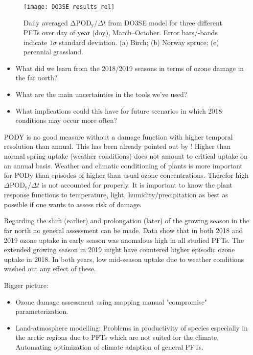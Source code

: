 \documentclass[bg, manuscript]{copernicus}
\begin{document}
\begin{figure}[t]
  \texttt{[image: DO3SE\_results\_rel]}
  \caption{Daily averaged $\mathrm{\Delta POD_y}/\Delta t$ from DO3SE model for three different PFTs over day of year (doy), March--October. Error bars/-bands indicate $1 \sigma$ standard deviation. (a) Birch; (b) Norway spruce; (c) perennial grassland.}
  \label{fig:pody_rel}
\end{figure}

\label{sec:conc} 
\begin{itemize}
  \item What did we learn from the 2018/2019 seasons in terms of ozone damage in the far north?
  \item What are the main uncertainties in the tools we've used?
  \item What implications could this have for future scenarios in which 2018 conditions may occur more often?
\end{itemize}
PODY is no good measure without a damage function with higher temporal resolution than annual. This has been already pointed out by \citet{AE:Musselman2006}! Higher than normal spring uptake (weather conditions) does not amount to critical uptake on an annual basis. 
Weather and climatic conditioning of plants is more important for PODy than episodes of higher than usual ozone concentrations. Therefor high $\Delta \mathrm{POD_y} / \Delta t$ is not accounted for properly.
It is important to know the plant response functions to temperature, light, humidity/precipitation as best as possible if one wants to assess risk of damage.

Regarding the shift (earlier) and prolongation (later) of the growing season in the far north no general assessment can be made. Data show that in both 2018 and 2019 ozone uptake in early season was anomalous high in all studied PFTs. The extended growing season in 2019 might have countered higher episodic ozone uptake in 2018. In both years, low mid-season uptake due to weather conditions washed out any effect of these.

Bigger picture:
\begin{itemize}
\item Ozone damage assessment using mapping manual "compromise" parameterization.
\item Land-atmosphere modelling: Problems in productivity of species especially in the arctic regions due to PFTs which are not suited for the climate. Automating optimization of climate adaption of general PFTs.
\end{itemize}
\end{document}
